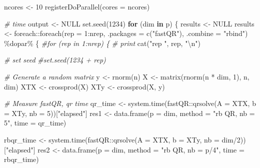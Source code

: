 \documentclass[]{tufte-handout}
\newenvironment{Shaded}{}{}
\newcommand{\AttributeTok}[1]{\textcolor[rgb]{0.49,0.56,0.16}{#1}}
\newcommand{\CommentTok}[1]{\textcolor[rgb]{0.38,0.63,0.69}{\textit{#1}}}
\newcommand{\ConstantTok}[1]{\textcolor[rgb]{0.53,0.00,0.00}{#1}}
\newcommand{\ControlFlowTok}[1]{\textcolor[rgb]{0.00,0.44,0.13}{\textbf{#1}}}
\newcommand{\DecValTok}[1]{\textcolor[rgb]{0.25,0.63,0.44}{#1}}
\newcommand{\FunctionTok}[1]{\textcolor[rgb]{0.02,0.16,0.49}{#1}}
\newcommand{\NormalTok}[1]{#1}
\newcommand{\OtherTok}[1]{\textcolor[rgb]{0.00,0.44,0.13}{#1}}
\newcommand{\SpecialCharTok}[1]{\textcolor[rgb]{0.25,0.44,0.63}{#1}}
\newcommand{\StringTok}[1]{\textcolor[rgb]{0.25,0.44,0.63}{#1}}
\begin{document}
\begin{Shaded}
\begin{Highlighting}[]
\NormalTok{ncores }\OtherTok{\textless{}{-}} \DecValTok{10}
\FunctionTok{registerDoParallel}\NormalTok{(}\AttributeTok{cores =}\NormalTok{ ncores)}

\CommentTok{\# time}
\NormalTok{output  }\OtherTok{\textless{}{-}} \ConstantTok{NULL}
\FunctionTok{set.seed}\NormalTok{(}\DecValTok{1234}\NormalTok{)}
\ControlFlowTok{for}\NormalTok{ (dim }\ControlFlowTok{in}\NormalTok{ p) \{}
\NormalTok{  results }\OtherTok{\textless{}{-}} \ConstantTok{NULL}
\NormalTok{  results }\OtherTok{\textless{}{-}}\NormalTok{ foreach}\SpecialCharTok{::}\FunctionTok{foreach}\NormalTok{(}\AttributeTok{rep =} \DecValTok{1}\SpecialCharTok{:}\NormalTok{nrep, }\AttributeTok{.packages =} \FunctionTok{c}\NormalTok{(}\StringTok{"fastQR"}\NormalTok{), }\AttributeTok{.combine =} \StringTok{"rbind"}\NormalTok{) }\SpecialCharTok{\%dopar\%}\NormalTok{ \{}
    \CommentTok{\#for (rep in 1:nrep) \{ }
    \CommentTok{\# print}
    \FunctionTok{cat}\NormalTok{(}\StringTok{"rep "}\NormalTok{, rep, }\StringTok{"}\SpecialCharTok{\textbackslash{}n}\StringTok{"}\NormalTok{)}
    
    \CommentTok{\# set seed}
    \CommentTok{\#set.seed(1234 + rep)}
    
    \CommentTok{\# Generate a random matrix}
\NormalTok{    y   }\OtherTok{\textless{}{-}} \FunctionTok{rnorm}\NormalTok{(n)}
\NormalTok{    X   }\OtherTok{\textless{}{-}} \FunctionTok{matrix}\NormalTok{(}\FunctionTok{rnorm}\NormalTok{(n }\SpecialCharTok{*}\NormalTok{ dim, }\DecValTok{1}\NormalTok{), n, dim)}
\NormalTok{    XTX }\OtherTok{\textless{}{-}} \FunctionTok{crossprod}\NormalTok{(X)}
\NormalTok{    XTy }\OtherTok{\textless{}{-}} \FunctionTok{crossprod}\NormalTok{(X, y)}
    
    \CommentTok{\# Measure fastQR, qr time}
\NormalTok{    qr\_time }\OtherTok{\textless{}{-}} \FunctionTok{system.time}\NormalTok{(fastQR}\SpecialCharTok{::}\FunctionTok{qrsolve}\NormalTok{(}\AttributeTok{A =}\NormalTok{ XTX, }\AttributeTok{b =}\NormalTok{ XTy, }\AttributeTok{nb =} \DecValTok{5}\NormalTok{))[}\StringTok{"elapsed"}\NormalTok{]}
\NormalTok{    res1    }\OtherTok{\textless{}{-}} \FunctionTok{data.frame}\NormalTok{(}\AttributeTok{p =}\NormalTok{ dim, }\AttributeTok{method =} \StringTok{"rb QR, nb = 5"}\NormalTok{, }\AttributeTok{time =}\NormalTok{ qr\_time)}
    
\NormalTok{    rbqr\_time }\OtherTok{\textless{}{-}} \FunctionTok{system.time}\NormalTok{(fastQR}\SpecialCharTok{::}\FunctionTok{qrsolve}\NormalTok{(}\AttributeTok{A =}\NormalTok{ XTX, }\AttributeTok{b =}\NormalTok{ XTy, }\AttributeTok{nb =}\NormalTok{ dim}\SpecialCharTok{/}\DecValTok{2}\NormalTok{))[}\StringTok{"elapsed"}\NormalTok{]}
\NormalTok{    res2      }\OtherTok{\textless{}{-}} \FunctionTok{data.frame}\NormalTok{(}\AttributeTok{p =}\NormalTok{ dim, }\AttributeTok{method =} \StringTok{"rb QR, nb = p/4"}\NormalTok{, }\AttributeTok{time =}\NormalTok{ rbqr\_time)}
    

\end{Highlighting}
\end{Shaded}
\end{document}
